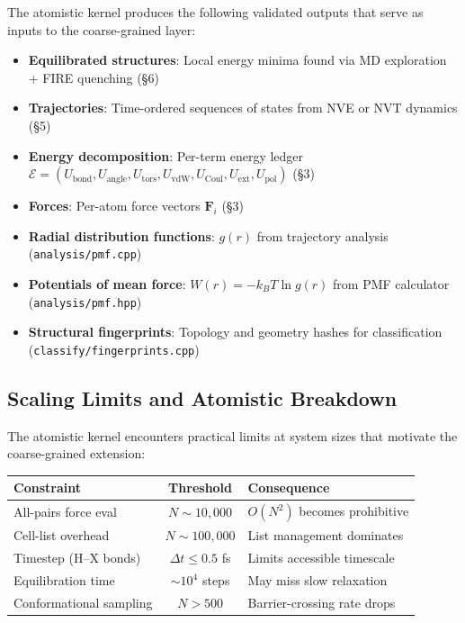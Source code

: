 \documentclass[11pt]{article}
\newcommand{\file}[1]{\texttt{#1}}
\begin{document}
The atomistic kernel produces the following validated outputs that serve as
inputs to the coarse-grained layer:

\begin{itemize}
  \item \textbf{Equilibrated structures}: Local energy minima found via
        MD exploration + FIRE quenching (\S6)
  \item \textbf{Trajectories}: Time-ordered sequences of states from NVE or
        NVT dynamics (\S5)
  \item \textbf{Energy decomposition}: Per-term energy ledger
        $\mathcal{E} = (U_\text{bond}, U_\text{angle}, U_\text{tors},
        U_\text{vdW}, U_\text{Coul}, U_\text{ext}, U_\text{pol})$ (\S3)
  \item \textbf{Forces}: Per-atom force vectors $\mathbf{F}_i$ (\S3)
  \item \textbf{Radial distribution functions}: $g(r)$ from trajectory
        analysis (\file{analysis/pmf.cpp})
  \item \textbf{Potentials of mean force}: $W(r) = -k_B T \ln g(r)$ from
        PMF calculator (\file{analysis/pmf.hpp})
  \item \textbf{Structural fingerprints}: Topology and geometry hashes for
        classification (\file{classify/fingerprints.cpp})
\end{itemize}

\subsection{Scaling Limits and Atomistic Breakdown}

The atomistic kernel encounters practical limits at system sizes that
motivate the coarse-grained extension:

\begin{center}
\begin{tabular}{lcl}
\toprule
\textbf{Constraint} & \textbf{Threshold} & \textbf{Consequence} \\
\midrule
All-pairs force eval & $N \sim 10{,}000$ & $O(N^2)$ becomes prohibitive \\
Cell-list overhead & $N \sim 100{,}000$ & List management dominates \\
Timestep (H--X bonds) & $\Delta t \leq 0.5$ fs & Limits accessible timescale \\
Equilibration time & $\sim 10^4$ steps & May miss slow relaxation \\
Conformational sampling & $N > 500$ & Barrier-crossing rate drops \\
\bottomrule
\end{tabular}
\end{center}
\end{document}
